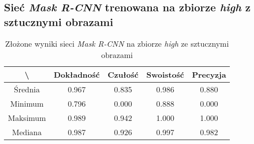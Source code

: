 \subsection{Sieć \textit{Mask R-CNN} trenowana na zbiorze \textit{high} z sztucznymi obrazami}

\begin{table}[H]
	\centering
	\caption{Złożone wyniki sieci \textit{Mask R-CNN} na zbiorze \textit{high} ze sztucznymi obrazami}
	\vspace{6pt}
	{\footnotesize
		\begin{tabular}{|c|c|c|c|c|}
      \hline \textbackslash & Dokładność & Czułość & Swoistość & Precyzja \\
      \hline Średnia & 0.967 & 0.835 & 0.986 & 0.880 \\
      \hline Minimum & 0.796 & 0.000 & 0.888 & 0.000 \\
      \hline Maksimum & 0.989 & 0.942 & 1.000 & 1.000 \\
      \hline Mediana & 0.987 & 0.926 & 0.997 & 0.982 \\
      \hline
		\end{tabular}
	}
  \vspace{0pt}
  \label{Tab:high_original_generated_calculated}
\end{table}

